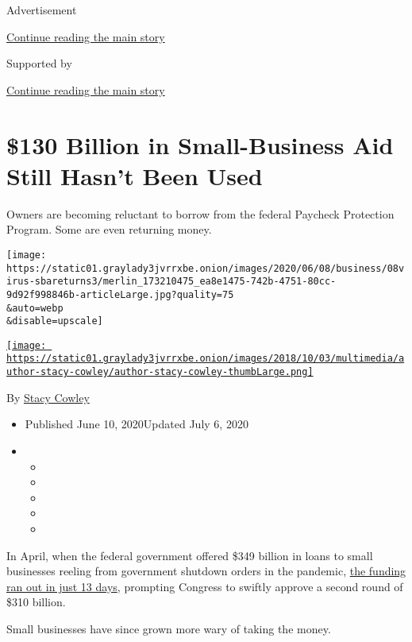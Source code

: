 Advertisement

\protect\hyperlink{after-top}{Continue reading the main story}

Supported by

\protect\hyperlink{after-sponsor}{Continue reading the main story}

\hypertarget{130-billion-in-small-business-aid-still-hasnt-been-used}{%
\section{\$130 Billion in Small-Business Aid Still Hasn't Been
Used}\label{130-billion-in-small-business-aid-still-hasnt-been-used}}

Owners are becoming reluctant to borrow from the federal Paycheck
Protection Program. Some are even returning money.

\texttt{[image: https://static01.graylady3jvrrxbe.onion/images/2020/06/08/business/08virus-sbareturns3/merlin\_173210475\_ea8e1475-742b-4751-80cc-9d92f998846b-articleLarge.jpg?quality=75\\\&auto=webp\\\&disable=upscale]}

\href{https://www.nytimes3xbfgragh.onion/by/stacy-cowley}{\texttt{[image: https://static01.graylady3jvrrxbe.onion/images/2018/10/03/multimedia/author-stacy-cowley/author-stacy-cowley-thumbLarge.png]}}

By \href{https://www.nytimes3xbfgragh.onion/by/stacy-cowley}{Stacy
Cowley}

\begin{itemize}
\item
  Published June 10, 2020Updated July 6, 2020
\item
  \begin{itemize}
  \item
  \item
  \item
  \item
  \item
  \end{itemize}
\end{itemize}

In April, when the federal government offered \$349 billion in loans to
small businesses reeling from government shutdown orders in the
pandemic,
\href{https://www.nytimes3xbfgragh.onion/2020/04/16/business/coronavirus-sba-loans-out-of-money.html}{the
funding ran out in just 13 days}, prompting Congress to swiftly approve
a second round of \$310 billion.

Small businesses have since grown more wary of taking the money.

